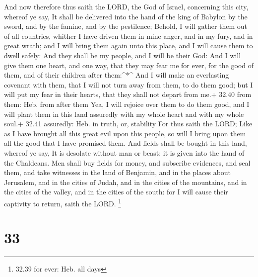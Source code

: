  And now therefore thus saith the LORD, the God of Israel,
concerning this city, whereof ye say, It shall be delivered into the
hand of the king of Babylon by the sword, and by the famine, and by the
pestilence;  Behold, I will gather them out of all
countries, whither I have driven them in mine anger, and in my fury, and
in great wrath; and I will bring them again unto this place, and I will
cause them to dwell safely:  And they shall be my people,
and I will be their God:  And I will give them one heart,
and one way, that they may fear me for ever, for the good of them, and
of their children after them:\^{}*\^{}  And I will make an
everlasting covenant with them, that I will not turn away from them, to
do them good; but I will put my fear in their hearts, that they shall
not depart from me.+ 32.40 from them: Heb. from after them 
Yea, I will rejoice over them to do them good, and I will plant them in
this land assuredly with my whole heart and with my whole soul.+ 32.41
assuredly: Heb. in truth, or, stability  For thus saith the
LORD; Like as I have brought all this great evil upon this people, so
will I bring upon them all the good that I have promised them.
 And fields shall be bought in this land, whereof ye say,
It is desolate without man or beast; it is given into the hand of the
Chaldeans.  Men shall buy fields for money, and subscribe
evidences, and seal them, and take witnesses in the land of Benjamin,
and in the places about Jerusalem, and in the cities of Judah, and in
the cities of the mountains, and in the cities of the valley, and in the
cities of the south: for I will cause their captivity to return, saith
the LORD. \footnote{32.39 for ever: Heb. all days}

\hypertarget{section-32}{%
\section{33}\label{section-32}}

